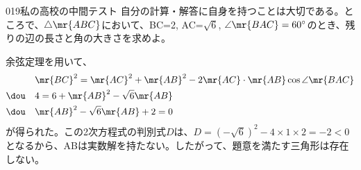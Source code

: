 \begin{thm}{019}{}{私の高校の中間テスト}
 自分の計算・解答に自身を持つことは大切である。ところで、$\triangle\mr{ABC}$において、BC=2, AC=$\sqrt{6}$, $\angle\mr{BAC}=60^\circ$のとき、残りの辺の長さと角の大きさを求めよ。
\end{thm}

余弦定理を用いて、
\begin{align*}
 &\mr{BC}^2=\mr{AC}^2+\mr{AB}^2-2\mr{AC}\cdot \mr{AB}\cos\angle\mr{BAC} \\
 \dou \quad &4=6+\mr{AB}^2-\sqrt{6}\mr{AB} \\
 \dou \quad &\mr{AB}^2-\sqrt{6}\mr{AB}+2=0
\end{align*}
が得られた。この2次方程式の判別式$D$は、$D=(-\sqrt{6})^2-4\times1\times2=-2<0$となるから、ABは実数解を持たない。したがって、題意を満たす三角形は存在しない。